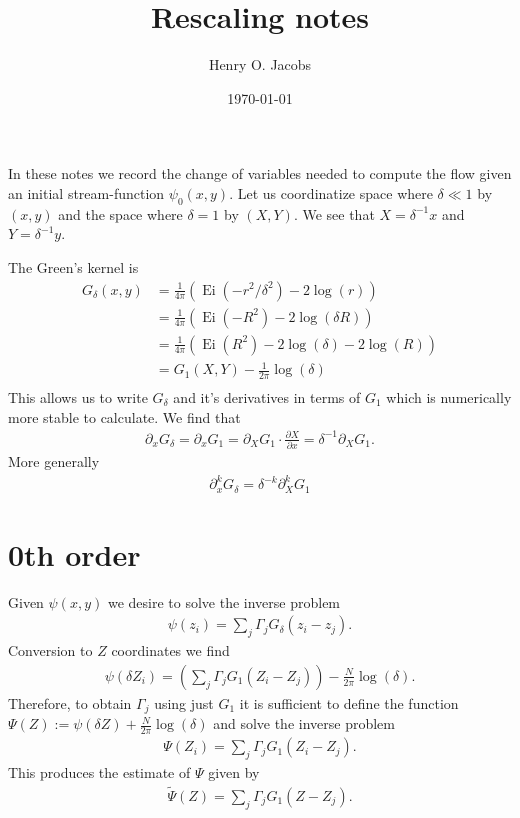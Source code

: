 \documentclass[12pt]{amsart}
\title{Rescaling notes}
\author{Henry O. Jacobs}
\date{\today}
\DeclareMathOperator{\Ei}{Ei}
\begin{document}
\maketitle

In these notes we record the change of variables needed to compute
the flow given an initial stream-function $\psi_0(x,y)$.
Let us coordinatize space where $\delta \ll 1$ by $(x,y)$
and the space where $\delta = 1$ by $(X,Y)$.
We see that $X = \delta^{-1} x$ and $Y = \delta^{-1}y$.

The Green's kernel is
\begin{align*}
  G_\delta(x,y) &= \frac{1}{4 \pi}( \Ei(-r^2 / \delta^2) - 2\log(r)) \\
  &= \frac{1}{4\pi} ( \Ei(-R^2)-2\log(\delta R)) \\
  &= \frac{1}{4\pi} ( \Ei(R^2) -2 \log(\delta) - 2 \log(R) ) \\
  &= G_1(X,Y) - \frac{1}{2\pi} \log(\delta) \\
\end{align*}
This allows us to write $G_\delta$ and it's derivatives in terms
of $G_1$ which is numerically more stable to calculate.
We find that
\begin{align*}
  \partial_x G_\delta = \partial_x G_1 = \partial_X G_1 \cdot \frac{\partial X}{\partial x} = \delta^{-1} \partial_X G_1.
\end{align*}
More generally
\begin{align*}
  \partial_x^k G_\delta = \delta^{-k} \partial_X^k G_1
\end{align*}


\section{0th order}
Given $\psi(x,y)$ we desire to solve the inverse problem
\begin{align*}
  \psi(z_i) = \sum_j \Gamma_j G_\delta( z_i - z_j).
\end{align*}
Conversion to $Z$ coordinates we find
\begin{align*}
  \psi(\delta Z_i) = \left(\sum_j \Gamma_j G_1( Z_i - Z_j) \right)- \frac{N}{2\pi} \log(\delta).
\end{align*}
Therefore, to obtain $\Gamma_j$ using just $G_1$
it is sufficient to define the function $\Psi(Z) := \psi(\delta Z) + \frac{N}{2\pi} \log(\delta)$
and solve the inverse problem
\begin{align*}
  \Psi(Z_i) = \sum_j \Gamma_j G_1(Z_i - Z_j).
\end{align*}
This produces the estimate of $\Psi$ given by
\begin{align*}
  \tilde{\Psi}(Z) = \sum_j \Gamma_j G_1(Z - Z_j).
\end{align*}
\end{document}

